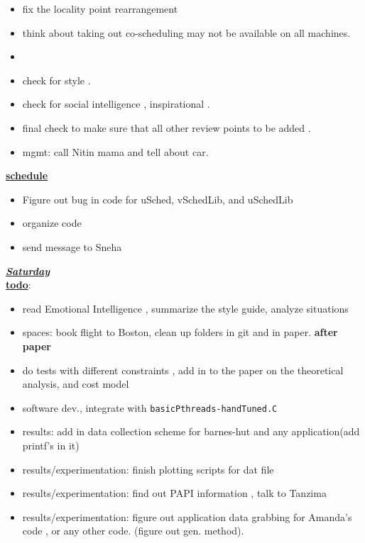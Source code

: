 \begin{itemize}
\item fix the locality point rearrangement
\item think about taking out co-scheduling may not be available on all
machines. 
\item 

\item check for style .
\item check for social intelligence , inspirational .

\item final check to make sure that all other review points to be added . 

\item mgmt: call Nitin mama and tell about car.

\end{itemize}

\underline{\textbf{schedule}}\\
\begin{itemize}
\item Figure out bug in code  for uSched, vSchedLib, and uSchedLib
\item organize code 
\item send message to Sneha 
\end{itemize}


\underline{\textbf{\textit{Saturday}}}\\
\underline{\textbf{todo}}:
\begin{itemize}
\item read Emotional Intelligence  , summarize the style guide, analyze situations
\item spaces: book flight to Boston, clean up folders in git and in paper.
\textbf{after paper}
\item do tests with different constraints ,  add in to the paper on the theoretical analysis, and cost model
\item software dev., integrate with \texttt{basicPthreads-handTuned.C}
\item results: add in data collection scheme for barnes-hut and any application(add printf's in it)
\item results/experimentation: finish plotting scripts for dat file
\item results/experimentation: find out PAPI information , talk to Tanzima
\item results/experimentation: figure out application data grabbing for Amanda's code , or any other code.  (figure out gen. method).
\end{itemize}

